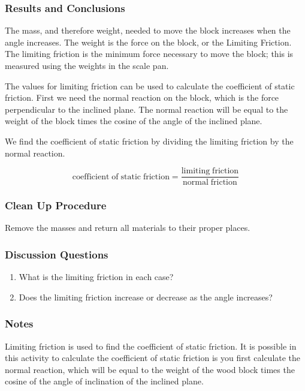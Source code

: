 \subsubsection*{Results and Conclusions}
The mass, and therefore weight, needed to move the block increases when the angle increases. The weight is the force on the block, or the Limiting Friction. The limiting friction is the minimum force necessary to move the block; this is measured using the weights in the scale pan.  

The values for limiting friction can be used to calculate the coefficient of static friction. First we need the normal reaction on the block, which is the force perpendicular to the inclined plane. The normal reaction will be equal to the weight of the block times the cosine of the angle of the inclined plane.  

We find the coefficient of static friction by dividing the limiting friction by the normal reaction.

\begin{center}
$$ \mathrm{coefficient \;of \;static \;friction} = \frac{\mathrm{limiting \;friction}}{\mathrm{normal \;friction}} $$
\end{center}

\subsubsection*{Clean Up Procedure}
Remove the masses and return all materials to their proper places.

\subsubsection*{Discussion Questions}
\begin{enumerate}
\item{What is the limiting friction in each case?}
\item{Does the limiting friction increase or decrease as the angle increases?}
\end{enumerate}

\subsubsection*{Notes}
Limiting friction is used to find the coefficient of static friction. It is possible in this activity to calculate the coefficient of static friction is you first calculate the normal reaction, which will be equal to the weight of the wood block times the cosine of the angle of inclination of the inclined plane.






